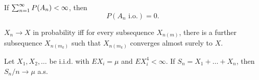 \documentclass[a4paper]{article}
\begin{document}
\begin{thm}
  If $\sum_{n=1}^\infty P(A_n) < \infty$, then 
  \[
  P(A_n \text{ i.o.}) = 0.
  \]
\end{thm}

\begin{thm}
  $X_n \to X$ in probability iff for every subsequence $X_{n(m)}$, there 
  is a further subsequence $X_{n(m_k)}$ such that $X_{n(m_k)}$ converges 
  almost surely to $X$.
\end{thm}

\begin{thm}
  Let $X_1, X_2, \dots$ be i.i.d. with $E X_i = \mu$ and $E X_i^4 < \infty$.
  If $S_n = X_1 + \dots + X_n$, then $S_n / n \to \mu$ a.s.
\end{thm}
\end{document}
